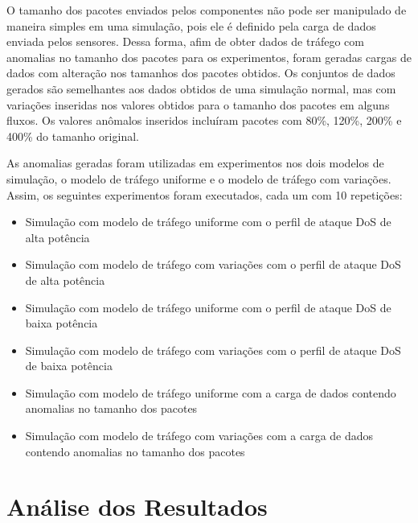 \documentclass[cic,tc]{iiufrgs}
\begin{document}
O tamanho dos pacotes enviados pelos componentes não pode ser manipulado de maneira simples em uma simulação, pois ele é definido pela carga de dados enviada pelos sensores. Dessa forma, afim de obter dados de tráfego com anomalias no tamanho dos pacotes para os experimentos, foram geradas cargas de dados com alteração nos tamanhos dos pacotes obtidos. Os conjuntos de dados gerados são semelhantes aos dados obtidos de uma simulação normal, mas com variações inseridas nos valores obtidos para o tamanho dos pacotes em alguns fluxos. Os valores anômalos inseridos incluíram pacotes com 80\%, 120\%, 200\% e 400\% do tamanho original.

As anomalias geradas foram utilizadas em experimentos nos dois modelos de simulação, o modelo de tráfego uniforme e o modelo de tráfego com variações. Assim, os seguintes experimentos foram executados, cada um com 10 repetições:
\begin{itemize}
\item{}Simulação com modelo de tráfego uniforme com o perfil de ataque DoS de alta potência
\item{}Simulação com modelo de tráfego com variações com o perfil de ataque DoS de alta potência
\item{}Simulação com modelo de tráfego uniforme com o perfil de ataque DoS de baixa potência
\item{}Simulação com modelo de tráfego com variações com o perfil de ataque DoS de baixa potência
\item{}Simulação com modelo de tráfego uniforme com a carga de dados contendo anomalias no tamanho dos pacotes
\item{}Simulação com modelo de tráfego com variações com a carga de dados contendo anomalias no tamanho dos pacotes
\end{itemize}

\section{Análise dos Resultados}
\label{sectionresults}
\end{document}
